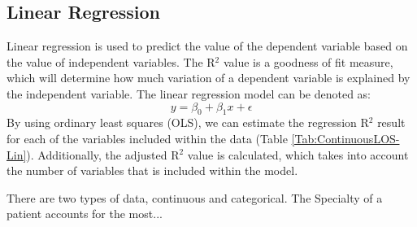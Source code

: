 \documentclass[../thesis.tex]{subfiles}
\begin{document}
\subsection{Linear Regression}
Linear regression is used to predict the value of the dependent variable based on the value of independent variables. The R$^2$ value is a goodness of fit measure, which will determine how much variation of a dependent variable is explained by the independent variable.
The linear regression model can be denoted as:
\begin{equation}
    y  = \beta_{0} + \beta_{1}x + \epsilon
\end{equation}
 By using ordinary least squares (OLS), we can estimate the regression R$^{2}$ result for each of the variables included within the data (Table \ref{Tab:ContinuousLOS-Lin}). Additionally, the adjusted R$^{2}$ value is calculated, which takes into account the number of variables that is included within the model.

\begin{table}[h!]
\centering{}
\caption{Linear Regression Result}
\label{Tab:ContinuousLOS-Lin}
\end{table}



There are two types of data, continuous and categorical. The Specialty of a patient accounts for the most...
\end{document}
